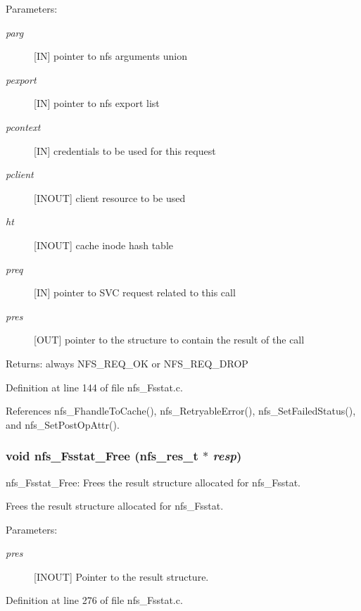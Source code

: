 \begin{Desc}
\item[Parameters:]
\begin{description}
\item[{\em parg}][IN] pointer to nfs arguments union \item[{\em pexport}][IN] pointer to nfs export list \item[{\em pcontext}][IN] credentials to be used for this request \item[{\em pclient}][INOUT] client resource to be used \item[{\em ht}][INOUT] cache inode hash table \item[{\em preq}][IN] pointer to SVC request related to this call \item[{\em pres}][OUT] pointer to the structure to contain the result of the call\end{description}
\end{Desc}
\begin{Desc}
\item[Returns:]always NFS\_\-REQ\_\-OK or NFS\_\-REQ\_\-DROP \end{Desc}


Definition at line 144 of file nfs\_\-Fsstat.c.

References nfs\_\-Fhandle\-To\-Cache(), nfs\_\-Retryable\-Error(), nfs\_\-Set\-Failed\-Status(), and nfs\_\-Set\-Post\-Op\-Attr().
\subsubsection{\setlength{\rightskip}{0pt plus 5cm}void nfs\_\-Fsstat\_\-Free (nfs\_\-res\_\-t $\ast$ {\em resp})}\label{nfs__Fsstat_8c_a1}


nfs\_\-Fsstat\_\-Free: Frees the result structure allocated for nfs\_\-Fsstat.

Frees the result structure allocated for nfs\_\-Fsstat.

\begin{Desc}
\item[Parameters:]
\begin{description}
\item[{\em pres}][INOUT] Pointer to the result structure. \end{description}
\end{Desc}


Definition at line 276 of file nfs\_\-Fsstat.c.